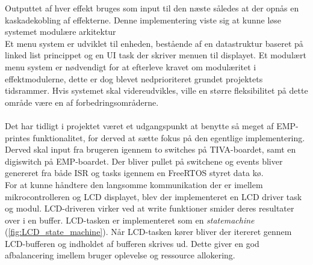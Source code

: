 Outputtet af hver effekt bruges som input til den næste således at der opnås en kaskadekobling af effekterne.
Denne implementering viste sig at kunne løse systemet modulære arkitektur 
\\
Et menu system er udviklet til enheden, bestående af en datastruktur baseret på linked list princippet og en UI task der skriver menuen til displayet.
Et modulært menu system er nødvendigt for at efterleve kravet om modulæritet i effektmodulerne, dette er dog blevet nedprioriteret grundet projektets tidsrammer.
Hvis systemet skal videreudvikles, ville en større fleksibilitet på dette område være en af forbedringsområderne.
\\
\\
Det har tidligt i projektet været et udgangspunkt at benytte så meget af EMP-printes funktionalitet, for derved at sætte fokus på den egentlige implementering. 
Derved skal input fra brugeren igennem to switches på TIVA-boardet, samt en digiswitch på EMP-boardet.
Der bliver pullet på switchene og events bliver genereret fra både ISR og tasks igennem en FreeRTOS styret data kø.
\\
For at kunne håndtere den langsomme kommunikation der er imellem mikrocontrolleren og LCD displayet, blev der implementeret en LCD driver task og modul. 
LCD-driveren virker ved at write funktioner smider deres resultater over i en buffer.
LCD-tasken er implementeret som en \textit{statemachine} (\ref{fig:LCD_state_machine}).
Når LCD-tasken kører bliver der itereret gennem LCD-bufferen og indholdet af bufferen skrives ud.
Dette giver en god afbalancering imellem bruger oplevelse og ressource allokering. 
